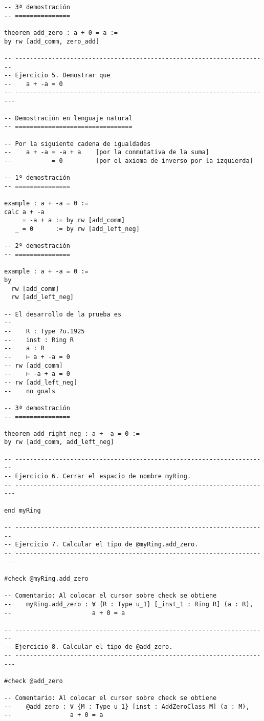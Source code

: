 \begin{verbatim}
-- 3ª demostración
-- ===============

theorem add_zero : a + 0 = a :=
by rw [add_comm, zero_add]

-- ---------------------------------------------------------------------
-- Ejercicio 5. Demostrar que
--    a + -a = 0
-- ----------------------------------------------------------------------

-- Demostración en lenguaje natural
-- ================================

-- Por la siguiente cadena de igualdades
--    a + -a = -a + a    [por la conmutativa de la suma]
--           = 0         [por el axioma de inverso por la izquierda]

-- 1ª demostración
-- ===============

example : a + -a = 0 :=
calc a + -a
     = -a + a := by rw [add_comm]
   _ = 0      := by rw [add_left_neg]

-- 2ª demostración
-- ===============

example : a + -a = 0 :=
by
  rw [add_comm]
  rw [add_left_neg]

-- El desarrollo de la prueba es
--
--    R : Type ?u.1925
--    inst : Ring R
--    a : R
--    ⊢ a + -a = 0
-- rw [add_comm]
--    ⊢ -a + a = 0
-- rw [add_left_neg]
--    no goals

-- 3ª demostración
-- ===============

theorem add_right_neg : a + -a = 0 :=
by rw [add_comm, add_left_neg]

-- ---------------------------------------------------------------------
-- Ejercicio 6. Cerrar el espacio de nombre myRing.
-- ----------------------------------------------------------------------

end myRing

-- ---------------------------------------------------------------------
-- Ejercicio 7. Calcular el tipo de @myRing.add_zero.
-- ----------------------------------------------------------------------

#check @myRing.add_zero

-- Comentario: Al colocar el cursor sobre check se obtiene
--    myRing.add_zero : ∀ {R : Type u_1} [_inst_1 : Ring R] (a : R),
--                      a + 0 = a

-- ---------------------------------------------------------------------
-- Ejercicio 8. Calcular el tipo de @add_zero.
-- ----------------------------------------------------------------------

#check @add_zero

-- Comentario: Al colocar el cursor sobre check se obtiene
--    @add_zero : ∀ {M : Type u_1} [inst : AddZeroClass M] (a : M),
--                a + 0 = a
\end{verbatim}

